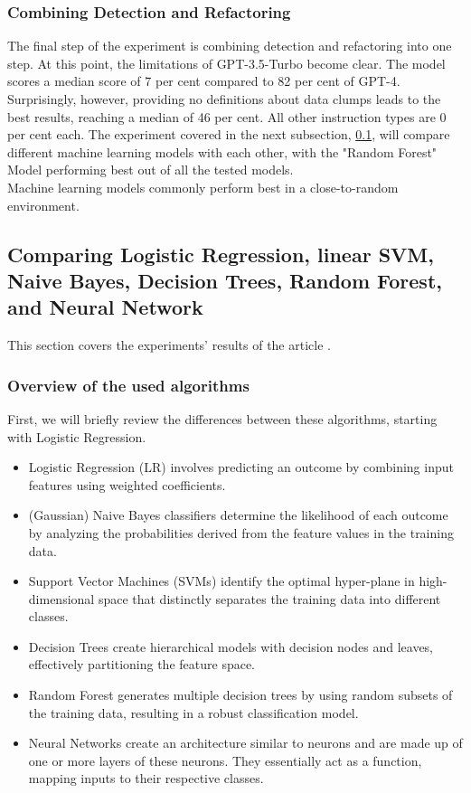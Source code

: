 \subsubsection{Combining Detection and Refactoring}
The final step of the experiment is combining detection and refactoring into one step. At this point, the limitations of GPT-3.5-Turbo become clear. The model scores a median score of 7 per cent compared to 82 per cent of GPT-4.
Surprisingly, however, providing no definitions about data clumps leads to the best results, reaching a median of 46 per cent.
All other instruction types are 0 per cent each.
The experiment covered in the next subsection, \ref{comparingAlgorithms}, will compare different machine learning models with each other, with the "Random Forest" Model performing best out of all the tested models.\\
Machine learning models commonly perform best in a close-to-random environment.
\subsection{Comparing Logistic Regression, linear SVM, Naive Bayes, Decision Trees, Random Forest, and Neural Network} \label{comparingAlgorithms}
This section covers the experiments' results of the article \cite[The effectiveness of supervised machine learning algorithms in predicting software refactoring]{aniche2020effectiveness}.
\subsubsection{Overview of the used algorithms}
First, we will briefly review the differences between these algorithms, starting with Logistic Regression.
\begin{itemize}
    \item Logistic Regression (LR) \cite{biship2007pattern} involves predicting an outcome by combining input features using weighted coefficients.
    \item (Gaussian) Naive Bayes classifiers \cite{zhang2014optimality} determine the likelihood of each outcome by analyzing the probabilities derived from the feature values in the training data.
    \item Support Vector Machines (SVMs) \cite{cortes1995support} identify the optimal hyper-plane in high-dimensional space that distinctly separates the training data into different classes.
    \item Decision Trees \cite{quinlan2014c4} create hierarchical models with decision nodes and leaves, effectively partitioning the feature space.
    \item Random Forest \cite{breiman2001random} generates multiple decision trees by using random subsets of the training data, resulting in a robust classification model.
    \item Neural Networks \cite{goodfellow2016deep} create an architecture similar to neurons and are made up of one or more layers of these neurons. They essentially act as a function, mapping inputs to their respective classes.
\end{itemize}

